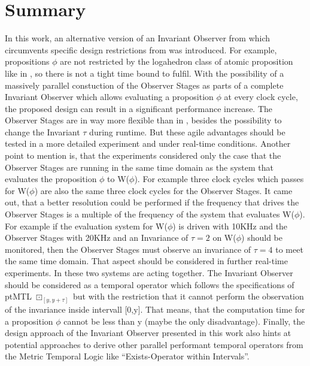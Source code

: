 \chapter{Summary}
\label{chapter:5}

\ifpdf
    \graphicspath{{Chapter3/Figs/Raster/}{Chapter3/Figs/PDF/}{Chapter3/Figs/}}
\else
    \graphicspath{{Chapter3/Figs/Vector/}{Chapter3/Figs/}}
\fi
In this work, an alternative version of an Invariant Observer from \cite{RTFMBJ13} which circumvents specific design restrictions from \cite{RTFMBJ13} was introduced.
For example, propositions $\phi$ are not restricted by the logahedron class of atomic proposition like in \cite{RTFMBJ13}, so there is not a tight time bound to fulfil. 
With the possibility of a massively parallel constuction of the Observer Stages as parts of a complete Invariant Observer which allows evaluating a proposition $\phi$ 
at every clock cycle, the proposed design can result in a significant performance increase.
The Observer Stages are in way more flexible than in \cite{RTFMBJ13}, besides the possibility to change the Invariant $\tau$ during runtime. 
But these agile advantages should be tested in a more detailed experiment and under real-time conditions.
Another point to mention is, that the experiments considered only the case that the Observer Stages are running in 
the same time domain as the system that evaluates the proposition $\phi$ to W($\phi$).
For example three clock cycles which passes for W($\phi$) are also the same three clock cycles for the Observer Stages. 
It came out, that a better resolution could be performed if
the frequency that drives the Observer Stages is a multiple of the frequency of the system that evaluates W($\phi$).
For example if the evaluation system for W($\phi$) is driven with 10KHz and the Observer Stages with 20KHz and an Invariance of $\tau = 2$ on W($\phi$) should be monitored, then the Observer Stages must observe an invariance
of $\tau = 4$ to meet the same time domain. That aspect should be considered in further real-time experiments. 
In \cite{RTFMBJ13} these two systems are acting together.
The Invariant Observer should be considered as a temporal operator which follows the specifications of ptMTL $\boxdot _{[ y,y+\tau ]}$ but with the restriction that it cannot perform the observation of the 
invariance inside intervall [0,y].
That means, that the computation time for a  proposition $\phi$ cannot be less than y (maybe the only disadvantage). 
Finally, the design approach of the Invariant Observer presented in this work also hints at potential approaches to derive other parallel performant temporal operators from
the Metric Temporal Logic like ``Exists-Operator within Intervals''.
 






